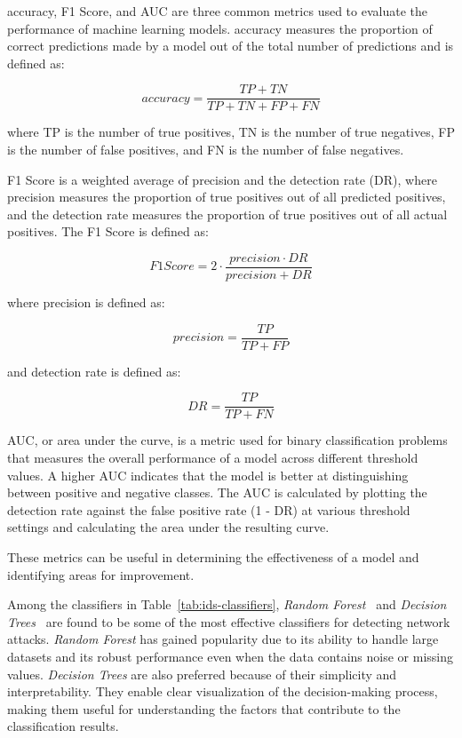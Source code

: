 accuracy, F1 Score, and AUC are three common metrics used to evaluate the performance of machine learning models.
accuracy measures the proportion of correct predictions made by a model out of the total number of predictions and is
defined as:

\[accuracy = \frac{TP + TN}{TP + TN + FP + FN}\]

where TP is the number of true positives, TN is the number of true negatives, FP is the number of false positives,
and FN is the number of false negatives.

F1 Score is a weighted average of precision and the detection rate (DR), where precision measures the proportion of true positives
out of all predicted positives, and the detection rate measures the proportion of true positives out of all actual positives.
The F1 Score is defined as:

\[F1 Score = 2 \cdot \frac{precision \cdot DR}{precision + DR}\]

where precision is defined as:

\[precision = \frac{TP}{TP + FP}\]

and detection rate is defined as:

\[DR = \frac{TP}{TP + FN}\]

AUC, or area under the curve, is a metric used for binary classification problems that measures the overall performance
of a model across different threshold values.
A higher AUC indicates that the model is better at distinguishing between positive and negative classes.
The AUC is calculated by plotting the detection rate against the false positive rate (1 - DR) at various
threshold settings and calculating the area under the resulting curve.

These metrics can be useful in determining the effectiveness of a model and identifying areas for improvement.

Among the classifiers in Table~\ref{tab:ids-classifiers}, \textit{Random Forest}~\cite{zhang2008random} and
\textit{Decision Trees}~\cite{amor2004naive} are found to be some of the most effective classifiers for detecting network attacks.
\textit{Random Forest} has gained popularity due to its ability to handle large datasets and its robust performance even when
the data contains noise or missing values.
\textit{Decision Trees} are also preferred because of their simplicity and interpretability.
They enable clear visualization of the decision-making process, making them useful for understanding the factors that
contribute to the classification results.

